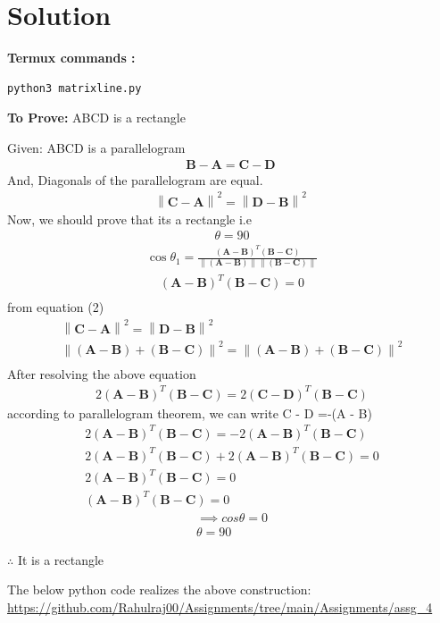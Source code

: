 \documentclass[10pt, a4paper]{article}
\providecommand{\norm}[1]{\left\lVert#1\right\rVert}
\providecommand{\brak}[1]{\ensuremath{\left(#1\right)}}
\let\vec\mathbf
\begin{document}
   \section{Solution}

\vspace{1mm}
\textbf{Termux commands :}
\begin{lstlisting}
python3 matrixline.py
\end{lstlisting}


\vspace{.25 cm}
\textbf{To Prove:}
ABCD is a rectangle

 Given:
 ABCD is a parallelogram
\begin{align}
 \vec{B} - \vec{A}= \vec{C}-\vec{D}\
	\end{align}
	And, Diagonals of the parallelogram are equal.
\begin{align}
 \norm{\vec{C} - \vec{A}}^2= \norm{\vec{D}-\vec{B}}^2\
	\end{align}
 	Now, we should prove that its a rectangle i.e
\begin{align}
 \theta = 90
\end{align} 	
 \begin{align}
 \cos \theta_1 =\frac{\mathbf{(A-B)}^T  \mathbf{(B-C)}}{\norm{\vec{(A-B)}}\norm{\vec{(B-C)}}}
 \end{align}
\begin{align}
\brak{\vec{A}-\vec{B}}^T
\brak{\vec{B}-\vec{C}} = 0
\\
\end{align}
from equation (2) 
\begin{align*}
 \norm{\vec{C} - \vec{A}}^2= \norm{\vec{D}-\vec{B}}^2\\
 \norm{{(\vec{A-B}) + (\vec{B-C})}}^2 = \norm{{(\vec{A-B}) + (\vec{B-C})}}^2\\
\end{align*}
After resolving the above equation 
\begin{align}
2(\vec{A}-\vec{B})^T (\vec{B}-\vec{C})=2(\vec{C}-\vec{D})^T (\vec{B}-\vec{C}) 
\end{align}
according to parallelogram theorem, we can write C - D =-(A - B)
\begin{align}
2(\vec{A}-\vec{B})^T (\vec{B}-\vec{C})=-2(\vec{A}-\vec{B})^T (\vec{B}-\vec{C}) \\
2(\vec{A}-\vec{B})^T (\vec{B}-\vec{C})+2(\vec{A}-\vec{B})^T (\vec{B}-\vec{C}) =0 \\
2(\vec{A}-\vec{B})^T (\vec{B}-\vec{C})=0\\
(\vec{A}-\vec{B})^T (\vec{B}-\vec{C})=0
\end{align}
\begin{align}
\implies cos\theta = 0\\
\theta = 90
\end{align}
 	
$\therefore$ It is a rectangle

\vspace{1mm}
The below python code realizes the above construction:	\\
\url{https://github.com/Rahulraj00/Assignments/tree/main/Assignments/assg_4}

\end{document}

